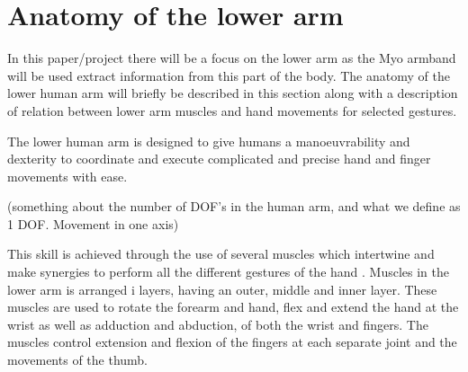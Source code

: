 \section{Anatomy of the lower arm}


In this paper/project there will be a focus on the lower arm as the Myo armband will be used extract information from this part of the body. The anatomy of the lower human arm will briefly be described in this section along with a description of relation between lower arm muscles and hand movements for selected gestures. 


The lower human arm is designed to give humans a manoeuvrability and dexterity to coordinate and execute complicated and precise hand and finger movements with ease.

(something about the number of DOF's in the human arm, and what we define as 1 DOF. Movement in one axis)

This skill is achieved through the use of several muscles which intertwine and make synergies to perform all the different gestures of the hand \cite{jiang2009} \cite{avella2006}. Muscles in the lower arm is arranged i layers, having an outer, middle and inner layer. These muscles are used to rotate the forearm and hand, flex and extend the hand at the wrist as well as adduction and abduction, of both the wrist and fingers. The muscles control extension and flexion of the fingers at each separate joint and the movements of the thumb. 

